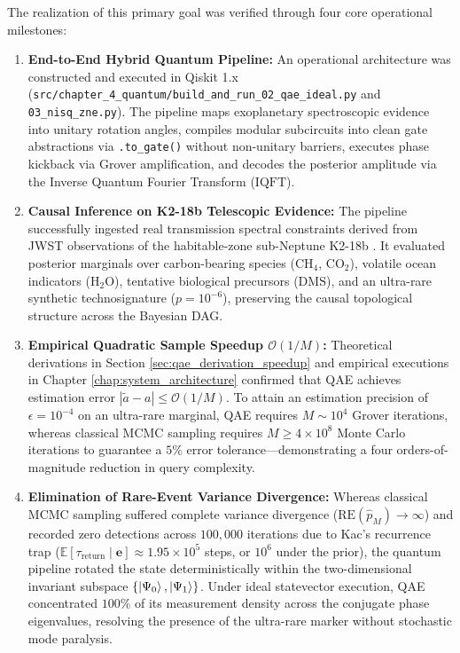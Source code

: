 The realization of this primary goal was verified through four core operational milestones:
\begin{enumerate}
    \item \textbf{End-to-End Hybrid Quantum Pipeline:} An operational architecture was constructed and executed in Qiskit 1.x (\texttt{src/chapter\_4\_quantum/build\_and\_run\_02\_qae\_ideal.py} and \texttt{03\_nisq\_zne.py}). The pipeline maps exoplanetary spectroscopic evidence into unitary rotation angles, compiles modular subcircuits into clean gate abstractions via \texttt{.to\_gate()} without non-unitary barriers, executes phase kickback via Grover amplification, and decodes the posterior amplitude via the Inverse Quantum Fourier Transform ($\mathrm{IQFT}$).
    \item \textbf{Causal Inference on K2-18b Telescopic Evidence:} The pipeline successfully ingested real transmission spectral constraints derived from JWST observations of the habitable-zone sub-Neptune K2-18b \cite{madhusudhan2023}. It evaluated posterior marginals over carbon-bearing species ($\mathrm{CH}_4$, $\mathrm{CO}_2$), volatile ocean indicators ($\mathrm{H}_2\mathrm{O}$), tentative biological precursors ($\mathrm{DMS}$), and an ultra-rare synthetic technosignature ($p = 10^{-6}$), preserving the causal topological structure across the Bayesian DAG.
    \item \textbf{Empirical Quadratic Sample Speedup $\mathcal{O}(1/M)$:} Theoretical derivations in Section \ref{sec:qae_derivation_speedup} and empirical executions in Chapter \ref{chap:system_architecture} confirmed that QAE achieves estimation error $|\tilde{a} - a| \le \mathcal{O}(1/M)$. To attain an estimation precision of $\epsilon = 10^{-4}$ on an ultra-rare marginal, QAE requires $M \sim 10^4$ Grover iterations, whereas classical MCMC sampling requires $M \ge 4 \times 10^8$ Monte Carlo iterations to guarantee a $5\%$ error tolerance—demonstrating a four orders-of-magnitude reduction in query complexity.
    \item \textbf{Elimination of Rare-Event Variance Divergence:} Whereas classical MCMC sampling suffered complete variance divergence ($\mathrm{RE}(\hat{p}_M) \to \infty$) and recorded zero detections across $100,000$ iterations due to Kac's recurrence trap ($\mathbb{E}[\tau_{\mathrm{return}} \mid \mathbf{e}] \approx 1.95 \times 10^5$ steps, or $10^6$ under the prior), the quantum pipeline rotated the state deterministically within the two-dimensional invariant subspace $\{\left|\Psi_0\right\rangle, \left|\Psi_1\right\rangle\}$. Under ideal statevector execution, QAE concentrated $100\%$ of its measurement density across the conjugate phase eigenvalues, resolving the presence of the ultra-rare marker without stochastic mode paralysis.
\end{enumerate}


